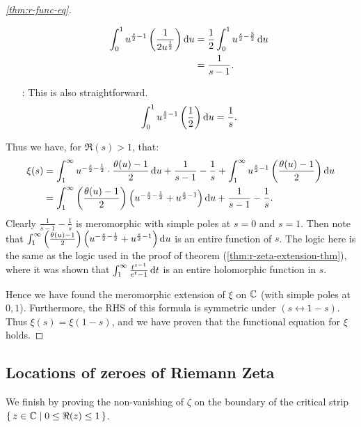 \begin{proof}[\ref{thm:r-func-eq}]
\begin{enumerate}
\begin{align*}
        \int_0^1 u^{\frac{s}{2} - 1} \br{\frac{1}{2 u^{\frac{1}{2}}}} \dif u &= \frac{1}{2} \int_0^1 u^{\frac{s}{2} - \frac{3}{2}} \dif u\\
        &= \frac{1}{s-1}.
    \end{align*}
    \item[\circled{3} :] This is also straightforward.
    \begin{align*}
        \int_0^1 u^{\frac{s}{2} - 1} \br{\frac{1}{2}} \dif u = \frac{1}{s}.
    \end{align*}
\end{enumerate}
Thus we have, for $\Re(s) > 1$, that:
\begin{align*}
    \xi(s) &= \int_1^\infty u^{-\frac{s}{2} - \frac{1}{2}} \cdot \frac{\theta (u ) - 1}{2} \dif u + \frac{1}{s-1} - \frac{1}{s} + \int_1^\infty u^{\frac{s}{2} - 1} \br{\frac{\theta(u) - 1}{2}} \dif u\\
    &= \int_1^\infty \br{\frac{\theta(u) - 1}{2}} \br{u^{-\frac{s}{2} - \frac{1}{2}} + u^{\frac{s}{2}-1}  } \dif u +\frac{1}{s-1} - \frac{1}{s}.
\end{align*}
Clearly $\frac{1}{s-1} - \frac{1}{s}$ is meromorphic with simple poles at $s=0$ and $s=1$. Then note that $\int_1^\infty \br{\frac{\theta(u) - 1}{2}} \br{u^{-\frac{s}{2} - \frac{1}{2}} + u^{\frac{s}{2} -1  }} \dif u$ is an entire function of $s$. The logic here is the same as the logic used in the proof of theorem (\ref{thm:r-zeta-extension-thm}), where it was shown that $\int_1^\infty \frac{t^{s-1}}{e^t - 1} \dif t$ is an entire holomorphic function in $s$.

Hence we have found the meromorphic extension of $\xi$ on $\mathbb{C}$ (with simple poles at $0,1$). Furthermore, the RHS of this formula is symmetric under $(s \leftrightarrow 1-s)$. Thus $\xi(s) = \xi(1-s)$, and we have proven that the functional equation for $\xi$ holds.

\end{proof}

\subsection{Locations of zeroes of Riemann Zeta}

We finish by proving the non-vanishing of $\zeta$ on the boundary of the critical strip $\set{z \in \mathbb{C}\mid 0 \leq \Re(z) \leq 1}$.

